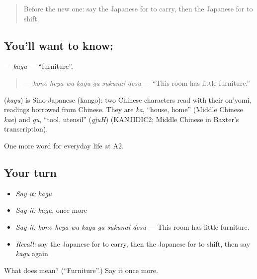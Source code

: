 \begin{quote}
Before the new one: say the Japanese for to carry, then the Japanese for to shift.
\end{quote}

\subsection*{You'll want to know: }
\textbf{} — \emph{kagu} — \textquotedblleft{}furniture\textquotedblright{}.

\begin{quote}
\textbf{   } — \emph{kono heya wa kagu ga sukunai desu} — \textquotedblleft{}This room has little furniture.\textquotedblright{}
\end{quote}

\begin{cousinweb}
\textbf{} (\emph{kagu}) is Sino-Japanese (kango): two Chinese characters read with their on'yomi, readings borrowed from Chinese. They are \emph{ka}, \textquotedblleft{}house, home\textquotedblright{} (Middle Chinese \emph{kae}) and \emph{gu}, \textquotedblleft{}tool, utensil\textquotedblright{} (\emph{gjuH}) (KANJIDIC2; Middle Chinese in Baxter's transcription).
\end{cousinweb}

\begin{grammarlens}[title={What you've built}]
One more word for everyday life at A2.
\end{grammarlens}

\subsection*{Your turn}
\begin{itemize}
\raggedright
  \item \emph{Say it:} \emph{kagu}
  \item \emph{Say it:} \emph{kagu}, once more
  \item \emph{Say it:} \emph{kono heya wa kagu ga sukunai desu} — This room has little furniture.
  \item \emph{Recall:} say the Japanese for to carry, then the Japanese for to shift, then say \emph{kagu} again
\end{itemize}

\begin{tcolorbox}[breakable,colback=teal!4,colframe=teal!35!black,title={Before you move on}]
What does  mean? (\textquotedblleft{}Furniture\textquotedblright{}.) Say it once more.
\end{tcolorbox}
